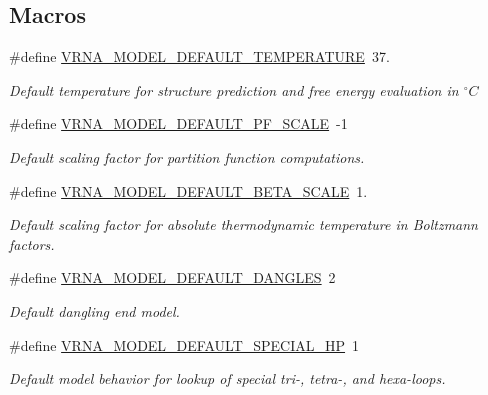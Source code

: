 \subsection*{Macros}
\begin{DoxyCompactItemize}
\item 
\#define \hyperlink{group__model__details_gaf47f9850b3b4763479f7a7e7a15648a2}{V\+R\+N\+A\+\_\+\+M\+O\+D\+E\+L\+\_\+\+D\+E\+F\+A\+U\+L\+T\+\_\+\+T\+E\+M\+P\+E\+R\+A\+T\+U\+RE}~37.
\begin{DoxyCompactList}\small\item\em   Default temperature for structure prediction and free energy evaluation in $^\circ C$  \end{DoxyCompactList}\item 
\#define \hyperlink{group__model__details_ga5505389cba74a18bbc116d2bb20256fa}{V\+R\+N\+A\+\_\+\+M\+O\+D\+E\+L\+\_\+\+D\+E\+F\+A\+U\+L\+T\+\_\+\+P\+F\+\_\+\+S\+C\+A\+LE}~-\/1
\begin{DoxyCompactList}\small\item\em Default scaling factor for partition function computations. \end{DoxyCompactList}\item 
\#define \hyperlink{group__model__details_ga383d3ac8d08c3b6221754b50871c1200}{V\+R\+N\+A\+\_\+\+M\+O\+D\+E\+L\+\_\+\+D\+E\+F\+A\+U\+L\+T\+\_\+\+B\+E\+T\+A\+\_\+\+S\+C\+A\+LE}~1.
\begin{DoxyCompactList}\small\item\em Default scaling factor for absolute thermodynamic temperature in Boltzmann factors. \end{DoxyCompactList}\item 
\#define \hyperlink{group__model__details_ga2aa7bc2cae774b83a5c468f824c27a42}{V\+R\+N\+A\+\_\+\+M\+O\+D\+E\+L\+\_\+\+D\+E\+F\+A\+U\+L\+T\+\_\+\+D\+A\+N\+G\+L\+ES}~2
\begin{DoxyCompactList}\small\item\em Default dangling end model. \end{DoxyCompactList}\item 
\#define \hyperlink{group__model__details_gabd1ab224e1048defd45c165ed7d1c108}{V\+R\+N\+A\+\_\+\+M\+O\+D\+E\+L\+\_\+\+D\+E\+F\+A\+U\+L\+T\+\_\+\+S\+P\+E\+C\+I\+A\+L\+\_\+\+HP}~1
\begin{DoxyCompactList}\small\item\em Default model behavior for lookup of special tri-\/, tetra-\/, and hexa-\/loops. \end{DoxyCompactList}\item 

\end{DoxyCompactItemize}
